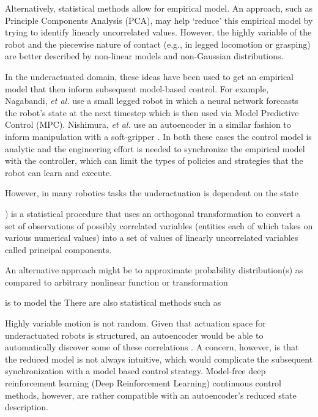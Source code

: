 \documentclass[letterpaper, 10 pt, conference]{ieeeconf}
\begin{document}
Alternatively, statistical methods allow for empirical model.  An approach, such as Principle Components Analysis (PCA), may help `reduce' this empirical model by trying to identify linearly uncorrelated values.  However, the highly variable of the robot and the piecewise nature of contact (e.g., in legged locomotion or grasping) are better described by non-linear models and non-Gaussian distributions.  

In the underactuated domain, these ideas have been used to get an empirical model that then inform subsequent model-based control.  For example, Nagabandi, \emph{et al.} \cite{nagabandi2018learning} use a small legged robot in which a neural network forecasts the robot's state at the next timestep which is then used via Model Predictive Control (MPC).  Nishimura, \emph{et al.} use an autoencoder in a similar fashion to inform manipulation with a soft-gripper \cite{nishimura2017thin}.  In both these cases the control model is analytic and the engineering effort is needed to synchronize the empirical model with the controller, which can limit the types of policies and strategies that the robot can learn and execute.















  However, in many robotics tasks the underactuation is dependent on the state  


) is a statistical procedure that uses an orthogonal transformation to convert a set of observations of possibly correlated variables (entities each of which takes on various numerical values) into a set of values of linearly uncorrelated variables called principal components.


An alternative approach might be to approximate  probability distribution(s) as compared to arbitrary nonlinear function or transformation

is to model the There are also statistical methods such as 











Highly variable motion is not random.
Given that actuation space for underactuated robots is structured, an autoencoder would be able to automatically discover some of these correlations \cite{AE_hinton2006reducing, ngsparse}.
A concern, however, is that the reduced model is not always intuitive, which would complicate the subsequent synchronization with a model based control strategy.
Model-free deep reinforcement learning (Deep Reinforcement Learning) continuous control methods, however, are rather compatible with an autoencoder's reduced state description.
\end{document}
